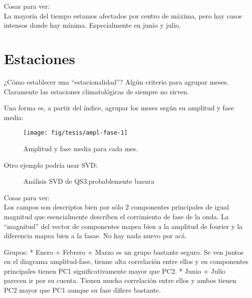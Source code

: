 \documentclass[spanish,a4paper]{book}
\begin{document}
Cosas para ver:\\
La mayoría del tiempo estamos afectados por centro de máxima, pero hay
casos intensos donde hay mínima. Especialmente en junio y julio.

\section{Estaciones}\label{estaciones}

¿Cómo establecer una ``estacionalidad''? Algún criterio para agrupar
meses. Claramente las estaciones climatológicas de siempre no sirven.

Una forma es, a partir del índice, agrupar los meses según su amplitud y
fase media:

\begin{figure}
\texttt{[image: fig/tesis/ampl-fase-1]} \caption{Amplitud y fase media para cada mes.}\label{fig:ampl-fase}
\end{figure}

Otro ejemplo podría usar SVD:

\begin{figure}
\newline{}\newline{}\newline{}\caption{Análisis SVD de QS3.probablemente basura}\label{fig:index-eof}
\end{figure}

Cosas para ver:\\
Los campos son descriptos bien por sólo 2 componentes principales de
igual magnitud que esencialmente describen el corrimiento de fase de la
onda. La ``magnitud'' del vector de componentes mapea bien a la amplitud
de fourier y la diferencia mapea bien a la fasae. No hay nada nuevo por
acá.

Grupos: * Enero + Febrero + Marzo es un grupo bastante seguro. Se ven
juntos en el diagrama amplitud-fase, tienne alta correlación entre ellos
y en componentes principales tienen PC1 significativamente mayor que
PC2. * Junio + Julio parecen ir por su cuenta. Tienen mucha correlación
entre ellos y ambos tienen PC2 mayor que PC1 aunque su fase difiere
bastante.
\end{document}
